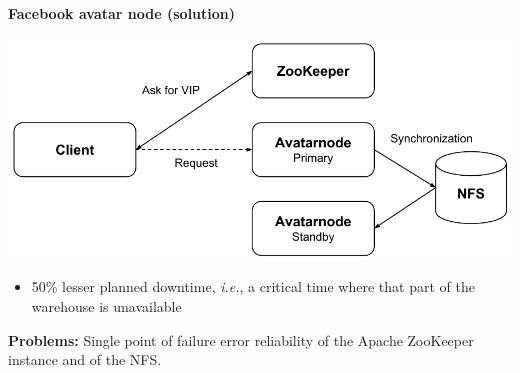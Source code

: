 \documentclass[paper=128mm:96mm, fontsize=11pt, pagesize, parskip=half-,]{scrartcl}
\theoremstyle{definition}
\newenvironment{Figure}
  {\par\medskip\noindent\minipage{\linewidth}}
  {\endminipage\par\medskip}
\newcommand*{\newslide}{\clearpage}
\begin{document}
\newslide
\textbf{Facebook avatar node (solution)}

\begin{Figure}
\centering\includegraphics[scale=0.42]{../Report/pdf/facebook-avatarnode.pdf}
\end{Figure}
\begin{itemize}
	\item 50\% lesser planned downtime, \textit{i.e.}, a critical time where that part of the warehouse is unavailable
\end{itemize}

\textbf{Problems: } Single point of failure error reliability of the Apache ZooKeeper instance and of the NFS.
\newslide
\end{document}
